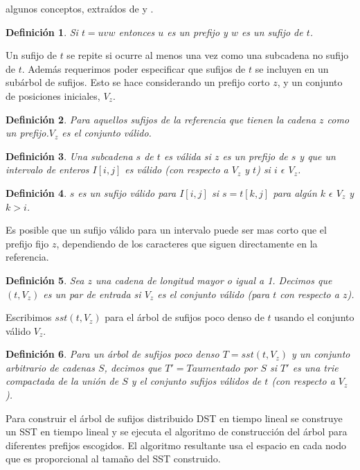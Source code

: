 \documentclass[11pt,a4paper,english]{article}
\newtheorem{mydef}{Definición}
\begin{document}
algunos conceptos, extraídos de \cite{Clifford2005} y \cite{Ghoting2010}. 
\begin{mydef}
  Si $t=uvw$ entonces $u$ es un \textit{prefijo} y $w$ es un \textit{sufijo}
de $t$.
\end{mydef}
Un sufijo de $t$ se repite si ocurre al menos una vez como una subcadena no sufijo de $t$.
Además requerimos poder especificar que sufijos de $t$ se incluyen en un subárbol de sufijos. Esto
se hace considerando un prefijo corto $z$, y un conjunto de posiciones iniciales, $V_{z}$.
\begin{mydef}
  Para aquellos sufijos de la referencia que tienen la cadena $z$ como un prefijo.$V_{z}$ es el conjunto válido.
\end{mydef}
\begin{mydef}
Una subcadena $s$ de $t$ es válida si $z$ es un prefijo de $s$ y que un intervalo de enteros $I[i,j]$ es
\textit{válido} (con respecto a $V_{z}$ y $t$) si $i$ $\epsilon$ $V_{z}$.
\end{mydef}
\begin{mydef}
  $s$ es un \textit{sufijo válido} para $I[i,j]$ si $s=t[k,j]$ para algún $k$ $\epsilon$ $V_{z}$ y $k>i$. 
\end{mydef}
Es posible que un sufijo válido para un intervalo puede ser mas corto que el prefijo fijo $z$, dependiendo de 
los caracteres que siguen directamente en la referencia.\\
\begin{mydef}
  Sea $z$ una cadena de longitud mayor o igual a 1. Decimos que $(t,V_{z})$ es un \textit{par de entrada} si $V_{z}$ es
el conjunto válido (para $t$ con respecto a $z$).
\end{mydef}
Escribimos $sst(t,V_{z})$ para el árbol de sufijos poco denso de $t$ usando el conjunto válido $V_{z}$. 
\begin{mydef}
  Para un árbol de sufijos poco denso $T=sst(t,V_{z})$ y un conjunto arbitrario de cadenas $S$, decimos que
  $T'=T aumentado$ por $S$ si $T'$ es una trie compactada de la unión de $S$ y el conjunto sufijos válidos de
  $t$ (con respecto a $V_{z}$).
\end{mydef}
Para construir el árbol de sufijos distribuido DST en tiempo lineal se construye un SST en tiempo lineal
y se ejecuta el algoritmo de construcción del árbol para diferentes prefijos escogidos. El algoritmo
resultante usa el espacio en cada nodo que es proporcional al tamaño del SST construido.
\end{document}

